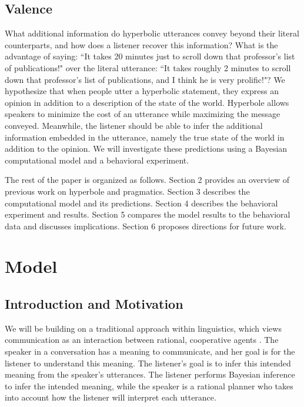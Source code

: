 \documentclass{article} %
\begin{document}
\subsection{Valence}
What additional information do hyperbolic utterances convey beyond their literal counterparts, and how does a listener recover this information? What is the advantage of saying: ``It takes 20 minutes just to scroll down that professor's list of publications!" over the literal utterance: ``It takes roughly 2 minutes to scroll down that professor's list of publications, and I think he is very prolific!"? We hypothesize that when people utter a hyperbolic statement, they express an opinion in addition to a description of the state of the world. Hyperbole allows speakers to minimize the cost of an utterance while maximizing the message conveyed. Meanwhile, the listener should be able to infer the additional information embedded in the utterance, namely the true state of the world in addition to the opinion. We will investigate these predictions using a Bayesian computational model and a behavioral experiment. 

The rest of the paper is organized as follows. Section 2 provides an overview of previous work on hyperbole and pragmatics. Section 3 describes the computational model and its predictions. Section 4 describes the behavioral experiment and results. Section 5 compares the model results to the behavioral data and discusses implications. Section 6 proposes directions for future work.


\section{Model}

\subsection{Introduction and Motivation}
We will be building on a traditional approach within linguistics, which views communication as an interaction between rational, cooperative agents \cite{grice1975}. The speaker in a conversation has a meaning to communicate, and her goal is for the listener to understand this meaning. The listener's goal is to infer this intended meaning from the speaker's utterances. The listener performs Bayesian inference to infer the intended meaning, while the speaker is a rational planner who takes into account how the listener will interpret each utterance. 
\end{document}
